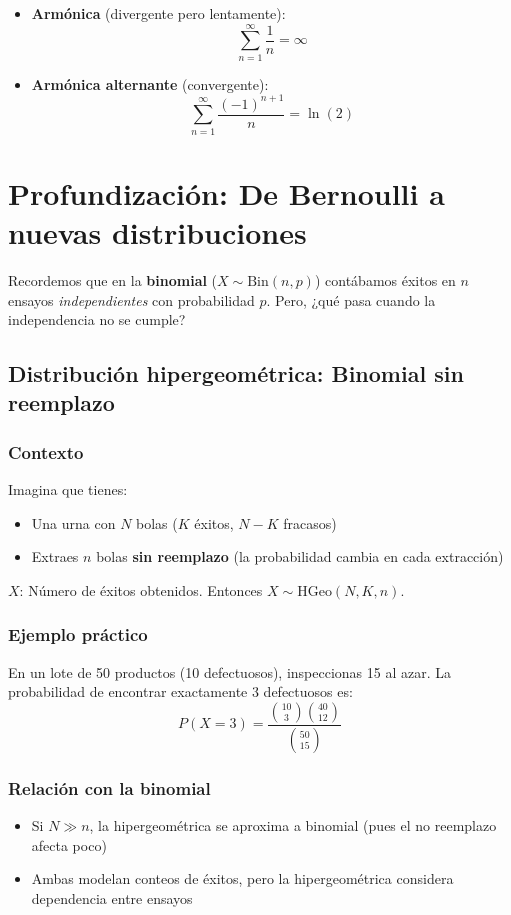 \documentclass[letterpaper, 12pt]{article}
\begin{document}
	\begin{itemize}
		\item \textbf{Armónica} (divergente pero lentamente):
		\[
		\sum_{n=1}^\infty \frac{1}{n} = \infty
		\]
		
		\item \textbf{Armónica alternante} (convergente):
		\[
		\sum_{n=1}^\infty \frac{(-1)^{n+1}}{n} = \ln(2)
		\]
	\end{itemize}
	
	\section{Profundización: De Bernoulli a nuevas distribuciones}
	
	Recordemos que en la \textbf{binomial} ($X \sim \text{Bin}(n,p)$) contábamos éxitos en $n$ ensayos \textit{independientes} con probabilidad $p$. Pero, ¿qué pasa cuando la independencia no se cumple?
	
	\subsection{Distribución hipergeométrica: Binomial sin reemplazo}
	
	\subsubsection{Contexto}
	Imagina que tienes:
	\begin{itemize}
		\item Una urna con $N$ bolas ($K$ éxitos, $N-K$ fracasos)
		\item Extraes $n$ bolas \textbf{sin reemplazo} (la probabilidad cambia en cada extracción)
	\end{itemize}
	
	$X$: Número de éxitos obtenidos. Entonces $X \sim \text{HGeo}(N,K,n)$.
	
	\subsubsection{Ejemplo práctico}
	En un lote de 50 productos (10 defectuosos), inspeccionas 15 al azar. La probabilidad de encontrar exactamente 3 defectuosos es:
	\[
	P(X=3) = \frac{\binom{10}{3}\binom{40}{12}}{\binom{50}{15}}
	\]
	
	\subsubsection{Relación con la binomial}
	\begin{itemize}
		\item Si $N \gg n$, la hipergeométrica se aproxima a binomial (pues el no reemplazo afecta poco)
		\item Ambas modelan conteos de éxitos, pero la hipergeométrica considera dependencia entre ensayos
	\end{itemize}
	
\end{document}
